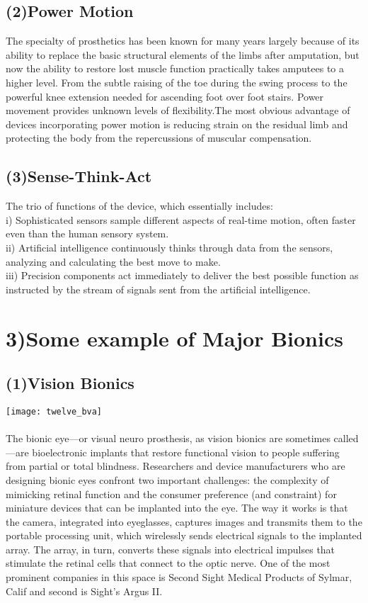 \documentclass{report}
\begin{document}
\subsection*{(2)Power Motion}
The specialty of prosthetics has been known for many years largely because of its ability to replace the basic structural elements of the limbs after amputation, but now the ability to restore lost muscle function practically takes amputees to a higher level. From the subtle raising of the toe during the swing process to the powerful knee extension needed for ascending foot over foot stairs. Power movement provides unknown levels of flexibility.The most obvious advantage of devices incorporating power motion is reducing strain on the residual limb and protecting the body from the repercussions of muscular compensation.
\subsection*{(3)Sense-Think-Act}
The trio of functions of the device, which essentially includes:\\
i) Sophisticated sensors sample different aspects of real-time motion, often faster even than the human sensory system.\\
ii) Artificial intelligence continuously thinks through data from the sensors, analyzing and calculating the best move to make.\\
iii) Precision components act immediately to deliver the best possible function as instructed by the stream of signals sent from the artificial intelligence.\\
\section*{3)Some example of Major Bionics}
\subsection*{(1)Vision Bionics}
\texttt{[image: twelve\_bva]}\\~\\
The bionic eye—or visual neuro prosthesis, as vision bionics are sometimes called—are bioelectronic implants that restore functional vision to people suffering from partial or total blindness. Researchers and device manufacturers who are designing bionic eyes confront two important challenges: the complexity of mimicking retinal function and the consumer preference (and constraint) for miniature devices that can be implanted into the eye. The way it works is that the camera, integrated into eyeglasses, captures images and transmits them to the portable processing unit, which wirelessly sends electrical signals to the implanted array. The array, in turn, converts these signals into electrical impulses that stimulate the retinal cells that connect to the optic nerve. One of the most prominent companies in this space is Second Sight Medical Products of Sylmar, Calif and second is Sight’s Argus II.
\end{document}
